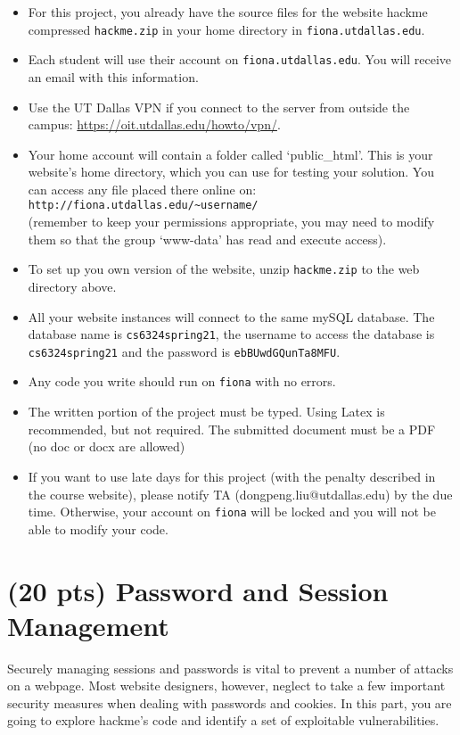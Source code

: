 \documentclass[]{article}
\begin{document}
\begin{itemize}
	\item For this project, you already have the source files for the website hackme compressed \verb"hackme.zip" in your home directory in \verb"fiona.utdallas.edu".
    \item Each student will use their account on \verb"fiona.utdallas.edu". You will receive an email with this information.
    \item Use the UT Dallas VPN if you connect to the server from outside the campus: \url{https://oit.utdallas.edu/howto/vpn/}.
	\item Your home account will contain a folder called `public\_html'. This is your website's home directory, which you can use for testing your solution. You can access any file placed there online on:\\
	\verb"http://fiona.utdallas.edu/~username/"\\
	(remember to keep your permissions appropriate, you may need to modify them so that the group `www-data' has read and execute access).
	\item To set up you own version of the website, unzip \verb"hackme.zip" to the web directory above.
	\item All your website instances will connect to the same mySQL database. The database name is \verb'cs6324spring21', the username to access the database is \verb'cs6324spring21' and the password is \verb"ebBUwdGQunTa8MFU".
	\item Any code you write should run on \verb"fiona" with no errors.
	\item The written portion of the project must be typed. Using Latex is recommended, but
	not required. The submitted document must be a PDF (no doc or docx are allowed)
    \item If you want to use late days for this project (with the penalty described in the course website), please notify TA (dongpeng.liu@utdallas.edu) by the due time. Otherwise, your account on \verb"fiona" will be locked and you will not be able to modify your code.
\end{itemize}

\section{(20 pts) Password and Session Management}
\label{sec:password_session_mgmt}

Securely managing sessions and passwords is vital to prevent a number of attacks on a webpage. Most website designers, however, neglect to take a few important security measures when dealing with passwords and cookies. In this part, you are going to explore hackme's code and identify a set of exploitable vulnerabilities.
\end{document}
